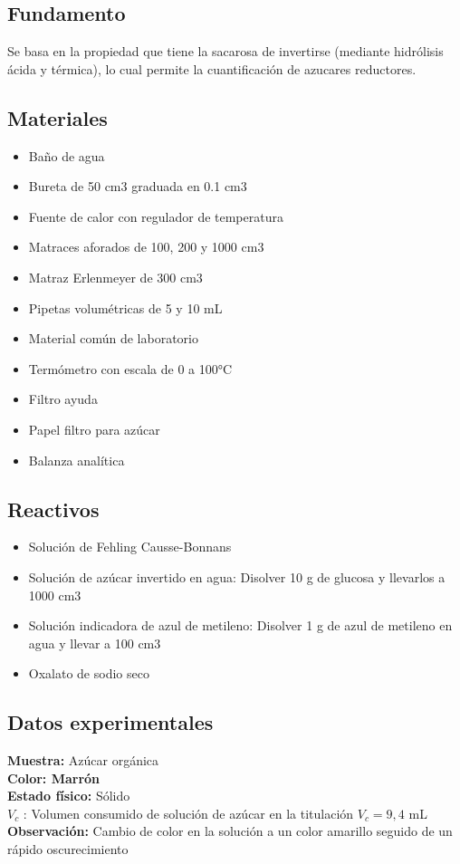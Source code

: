 \documentclass[a4paper,12pt]{article} %
\begin{document}
\subsection{Fundamento} 
Se basa en la propiedad que tiene la sacarosa de invertirse (mediante hidrólisis ácida y térmica), lo cual permite la cuantificación de azucares reductores.

\subsection{Materiales} 
\begin{itemize}
\item {Baño de agua}
\item {Bureta de 50 cm3 graduada en 0.1 cm3}
\item {Fuente de calor con regulador de temperatura}
\item {Matraces aforados de 100, 200 y 1000 cm3}
\item {Matraz Erlenmeyer de 300 cm3}
\item {Pipetas volumétricas de 5 y 10 mL}
\item {Material común de laboratorio}
\item {Termómetro con escala de 0 a 100°C}
\item {Filtro ayuda}
\item {Papel filtro para azúcar}
\item {Balanza analítica}
\end{itemize}

\subsection{Reactivos}
\begin{itemize}
\item {Solución de Fehling Causse-Bonnans}
\item {Solución de azúcar invertido en agua: Disolver 10 g de glucosa y llevarlos a 1000 cm3}
\item {Solución indicadora de azul de metileno: Disolver 1 g de azul de metileno en agua y llevar a 100 cm3}
\item {Oxalato de sodio seco}
\end{itemize}

\subsection{Datos experimentales}
\textbf{Muestra:} Azúcar orgánica\\
\textbf{Color: Marrón} \\
\textbf{Estado físico:} Sólido \\ 
$V_c$ : Volumen consumido de solución de azúcar en la titulación 
$V_c = 9,4$ mL \\ 
\textbf{Observación:} Cambio de color en la solución a un color amarillo seguido de un rápido oscurecimiento 
\end{document}
